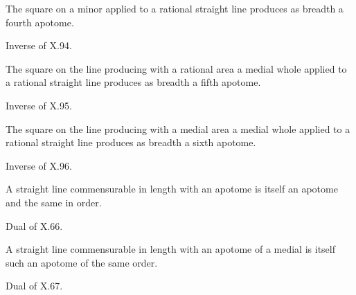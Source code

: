 \begin{claim}
\label{prop:X.100}
The square on a minor applied to a rational straight line produces
as breadth a fourth apotome.
\end{claim}
\begin{evidence}[Proof of X.100]
\label{ev:X.100}
Inverse of X.94.
\end{evidence}

\begin{claim}
\label{prop:X.101}
The square on the line producing with a rational area a medial whole
applied to a rational straight line produces as breadth a fifth
apotome.
\end{claim}
\begin{evidence}[Proof of X.101]
\label{ev:X.101}
Inverse of X.95.
\end{evidence}

\begin{claim}
\label{prop:X.102}
The square on the line producing with a medial area a medial whole
applied to a rational straight line produces as breadth a sixth
apotome.
\end{claim}
\begin{evidence}[Proof of X.102]
\label{ev:X.102}
Inverse of X.96.
\end{evidence}

\begin{claim}
\label{prop:X.103}
A straight line commensurable in length with an apotome is itself an
apotome and the same in order.
\end{claim}
\begin{evidence}[Proof of X.103]
\label{ev:X.103}
Dual of X.66.
\end{evidence}

\begin{claim}
\label{prop:X.104}
A straight line commensurable in length with an apotome of a medial
is itself such an apotome of the same order.
\end{claim}
\begin{evidence}[Proof of X.104]
\label{ev:X.104}
Dual of X.67.
\end{evidence}

